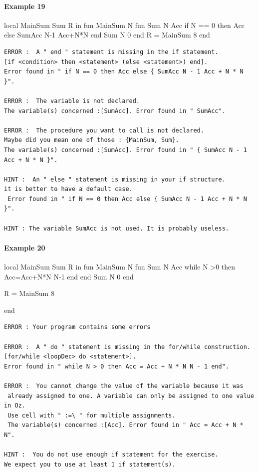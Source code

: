 \documentclass[11pt,a4paper,twoside,openright]{report}
\begin{document}
\paragraph{Example 19}
\begin{OZ}
local MainSum Sum R in
	fun {MainSum N}
		fun {Sum N Acc}
			if N == 0 then Acc
			else {SumAcc N-1 Acc+N*N}
	    end
    {Sum N 0}
	end
	R = {MainSum 8}
end

\end{OZ}

\begin{lstlisting}
ERROR :  A " end " statement is missing in the if statement. 
[if <condition> then <statement> (else <statement>) end]. 
Error found in " if N == 0 then Acc else { SumAcc N - 1 Acc + N * N }".

ERROR :  The variable is not declared. 
The variable(s) concerned :[SumAcc]. Error found in " SumAcc".

ERROR :  The procedure you want to call is not declared. 
Maybe did you mean one of those : {MainSum, Sum}.
The variable(s) concerned :[SumAcc]. Error found in " { SumAcc N - 1 Acc + N * N }".

HINT :  An " else " statement is missing in your if structure. 
it is better to have a default case.
 Error found in " if N == 0 then Acc else { SumAcc N - 1 Acc + N * N }".

HINT : The variable SumAcc is not used. It is probably useless.
\end{lstlisting}

\paragraph{Example 20}
\begin{OZ}
local MainSum Sum R in
	fun {MainSum N}
		fun {Sum N Acc}
			while N >0 then
				Acc=Acc+N*N
				N-1
			end	    
		end
    {Sum N 0}
	end

	R = {MainSum 8}

end

\end{OZ}
\newpage
\begin{lstlisting}
ERROR : Your program contains some errors

ERROR :  A " do " statement is missing in the for/while construction. 
[for/while <loopDec> do <statement>]. 
Error found in " while N > 0 then Acc = Acc + N * N N - 1 end".

ERROR :  You cannot change the value of the variable because it was
 already assigned to one. A variable can only be assigned to one value in Oz. 
 Use cell with " :=\ " for multiple assignments. 
 The variable(s) concerned :[Acc]. Error found in " Acc = Acc + N * N".

HINT :  You do not use enough if statement for the exercise. 
We expect you to use at least 1 if statement(s).
 \end{lstlisting}
\end{document}
